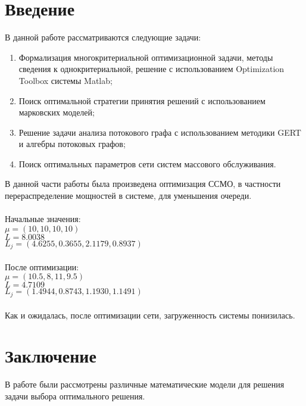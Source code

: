 


%
\tableofcontents
\clearpage

%

\chapter*{Введение}
В данной работе рассматриваются следующие задачи:
\begin{enumerate}
\item Формализация многокритериальной оптимизационной задачи, методы сведения к однокритериальной, решение с использованием Optimization Toolbox системы Matlab;
\item Поиск оптимальной стратегии принятия решений с использованием марковских моделей;
\item Решение задачи анализа потокового графа с использованием методики GERT и алгебры потоковых графов;
\item Поиск оптимальных параметров сети систем массового обслуживания.
\end{enumerate}







В данной части работы была произведена оптимизация ССМО, в частности перераспределение мощностей в системе, для уменьшения очереди.\\\\
Начальные значения:\\
$\mu = (10, 10,10, 10)$\\
$L = 8.0038$\\
$L_j= (4.6255, 0.3655, 2.1179, 0.8937)$\\\\
После оптимизации:\\
$\mu = (10.5, 8, 11, 9.5)$\\
$L = 4.7109$\\
$L_j= (1.4944, 0.8743, 1.1930, 1.1491)$\\\\
Как и ожидалась, после оптимизации сети, загруженность системы понизилась.




\chapter*{Заключение}
В работе были рассмотрены различные математические модели для решения задачи выбора оптимального решения.

